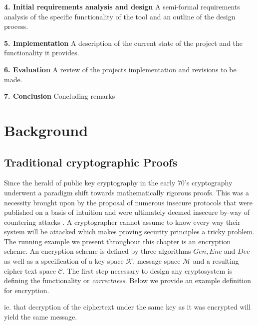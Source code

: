 \documentclass[bsc,frontabs,singlespacing,parskip,deptreport]{infthesis}
\newcommand{\chapsubhead}[1]{\vspace{0.5em}\textbf{\large #1 \vspace{0.5em}}}
\begin{document}
\chapsubhead{4. Initial requirements analysis and design}
\newline
 A semi-formal requirements analysis of the specific functionality of the tool and an outline of the design process. 
 
\chapsubhead{5. Implementation}
\newline
A description of the current state of the project and the functionality it provides. 

\chapsubhead{6. Evaluation}
\newline
A review of the projects implementation and revisions to be made. 

\chapsubhead{7. Conclusion}
\newline
Concluding remarks 

\chapter{Background}

\section{Traditional cryptographic Proofs}\label{sec-tcp}
Since the herald of public key cryptography in the early 70's \cite{DH,RSA} cryptography underwent a paradigm shift towards mathematically rigorous proofs. This was a necessity brought upon by the proposal of numerous insecure protocols that were published on a basis of intuition and were ultimately deemed insecure by-way of countering attacks \cite{lowe_1995,shamir_1982}. A cryptographer cannot assume to know every way their system will be attacked which makes proving security principles a tricky problem. The running example we present throughout this chapter is an encryption scheme. An encryption scheme is defined by three algorithms $Gen,Enc$ and $Dec$ as well as a specification of a key space $\mathcal{K}$, message space $\mathcal{M}$ and a resulting cipher text space $\mathcal{C}$. The first step necessary to design any cryptosystem is defining the functionality or \textit{correctness}. Below we provide an example definition for encryption.

{}

ie. that decryption of the ciphertext under the same key as it was encrypted will yield the same message.
\end{document}
